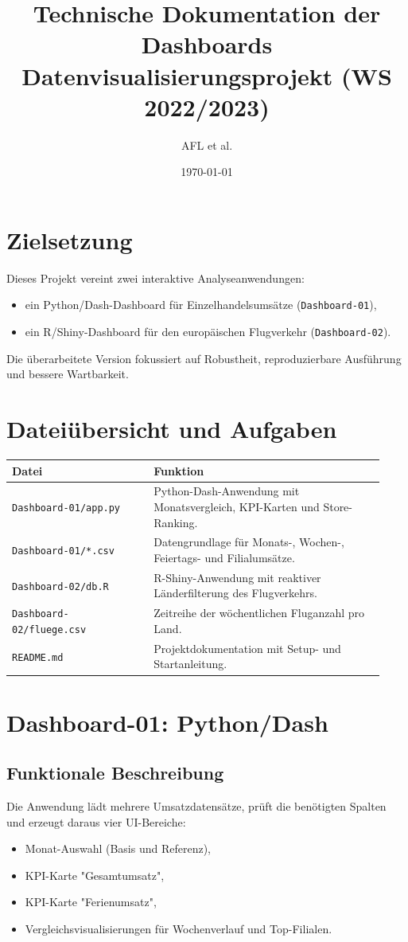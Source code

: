 \documentclass[a4paper,11pt]{article}
\title{Technische Dokumentation der Dashboards\\
\large Datenvisualisierungsprojekt (WS 2022/2023)}
\author{AFL et al.}
\date{\today}
\begin{document}
\maketitle
\tableofcontents
\newpage

\section{Zielsetzung}
Dieses Projekt vereint zwei interaktive Analyseanwendungen:
\begin{itemize}
  \item ein Python/Dash-Dashboard für Einzelhandelsumsätze (\texttt{Dashboard-01}),
  \item ein R/Shiny-Dashboard für den europäischen Flugverkehr (\texttt{Dashboard-02}).
\end{itemize}

Die überarbeitete Version fokussiert auf Robustheit, reproduzierbare Ausführung und bessere Wartbarkeit.

\section{Dateiübersicht und Aufgaben}
\begin{longtable}{p{0.35\linewidth} p{0.58\linewidth}}
\toprule
\textbf{Datei} & \textbf{Funktion} \\
\midrule
\texttt{Dashboard-01/app.py} & Python-Dash-Anwendung mit Monatsvergleich, KPI-Karten und Store-Ranking. \\
\texttt{Dashboard-01/*.csv} & Datengrundlage für Monats-, Wochen-, Feiertags- und Filialumsätze. \\
\texttt{Dashboard-02/db.R} & R-Shiny-Anwendung mit reaktiver Länderfilterung des Flugverkehrs. \\
\texttt{Dashboard-02/fluege.csv} & Zeitreihe der wöchentlichen Fluganzahl pro Land. \\
\texttt{README.md} & Projektdokumentation mit Setup- und Startanleitung. \\
\bottomrule
\end{longtable}

\section{Dashboard-01: Python/Dash}
\subsection{Funktionale Beschreibung}
Die Anwendung lädt mehrere Umsatzdatensätze, prüft die benötigten Spalten und erzeugt daraus vier UI-Bereiche:
\begin{itemize}
  \item Monat-Auswahl (Basis und Referenz),
  \item KPI-Karte "Gesamtumsatz",
  \item KPI-Karte "Ferienumsatz",
  \item Vergleichsvisualisierungen für Wochenverlauf und Top-Filialen.
\end{itemize}
\end{document}
